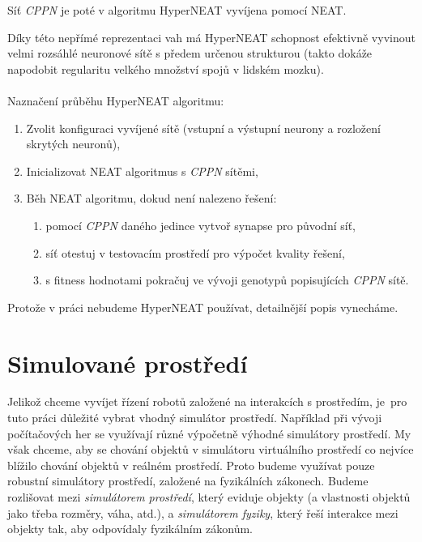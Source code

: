 Síť \emph{CPPN} je poté v algoritmu HyperNEAT vyvíjena pomocí NEAT.

Díky této nepřímé reprezentaci vah má HyperNEAT schopnost efektivně vyvinout
velmi rozsáhlé neuronové sítě s předem určenou strukturou (takto dokáže
napodobit regularitu velkého množství spojů v lidském mozku).

\paragraph{}
Naznačení průběhu HyperNEAT algoritmu:
\begin{enumerate}
    \item Zvolit konfiguraci vyvíjené sítě (vstupní a výstupní neurony a
        rozložení skrytých neuronů),
    \item Inicializovat NEAT algoritmus s \emph{CPPN} sítěmi,
    \item Běh NEAT algoritmu, dokud není nalezeno řešení:
        \begin{enumerate}
            \item pomocí \emph{CPPN} daného jedince vytvoř synapse pro původní
                síť,
            \item síť otestuj v testovacím prostředí pro výpočet kvality
                řešení,
            \item s fitness hodnotami pokračuj ve vývoji genotypů popisujících
                \emph{CPPN} sítě.
        \end{enumerate}
\end{enumerate}

Protože v práci nebudeme HyperNEAT používat, detailnější popis vynecháme.

\section{Simulované prostředí} \label{Simulované prostředí}

Jelikož chceme vyvíjet řízení robotů založené na interakcích s prostředím,
je~pro tuto práci důležité vybrat vhodný simulátor prostředí. Například při
vývoji počítačových her se využívají různé výpočetně výhodné simulátory
prostředí. My však chceme, aby se chování objektů v simulátoru virtuálního
prostředí co nejvíce blížilo chování objektů v reálném prostředí. Proto budeme
využívat pouze robustní simulátory prostředí, založené na fyzikálních zákonech.
Budeme rozlišovat mezi \emph{simulátorem prostředí}, který eviduje objekty (a
vlastnosti objektů jako třeba rozměry, váha, atd.), a \emph{simulátorem
fyziky}, který řeší interakce mezi objekty tak, aby odpovídaly fyzikálním
zákonům. 

